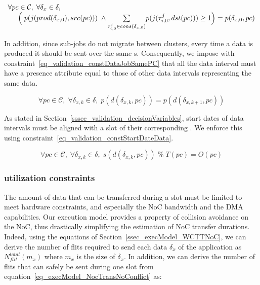\documentclass[main.tex]{subfiles}
\begin{document}
\begin{equation}
    \label{eq_validation_constDataPCmapping}
    \begin{array}{l}
        \forall pc \in \mathcal{C}, \; \forall \delta_{x} \in \delta,  \\
        \hspace{5mm} \Big( \; p(j(prod(\delta_{x,0}), src(pc))) \; \land \underset{\tau_{i,0}^j \in cons(\delta_{x,0})}{\sum} p(j(\tau_{i,0}^j , dst(pc))) \geq 1   \Big)  = p( \delta_{x,0} , pc  ) 
    \end{array}
\end{equation}

In addition, since sub-jobs do not migrate between clusters, every time a data
is produced it should be sent over the same \PC{}s. Consequently, we impose
with constraint~\ref{eq_validation_constDataJobSamePC} that all the data
interval must have a presence attribute equal to those of other data intervals
representing the same data.

\begin{equation}
    \label{eq_validation_constDataJobSamePC}
    \forall pc \in \mathcal{C}, \; \forall \delta_{x,k} \in \delta, \; 
    p( d( \delta_{x,k} , pc ) ) = p( d( \delta_{x,k+1} , pc ) )
\end{equation}

As stated in Section~\ref{sssec_validation_decisionVariables}, start dates of
data intervals must be aligned with a slot of their corresponding \PC{}. We
enforce this using constraint~\ref{eq_validation_constStartDateData}.

\begin{equation}
    \label{eq_validation_constStartDateData}
    \forall pc \in \mathcal{C}, \; \forall \delta_{x,k} \in \delta, \; 
    s( d( \delta_{x,k}, pc ) ) \; \% \; T(pc) = O(pc)
\end{equation}

\subsubsection{\PC{} utilization constraints}
\label{sssec_validation_PCutilConst}
The amount of data that can be transferred during a \PC{} slot must be limited
to meet hardware constraints, and especially the NoC bandwidth and the DMA
capabilities. Our execution model provides a property of collision avoidance on
the NoC, thus drastically simplifying the estimation of NoC transfer durations.
Indeed, using the equations of Section~\ref{ssec_execModel_WCTTNoC}, we can
derive the number of flits required to send each data $\delta_x$ of the
application as $N_{flit}^{total} ( m_x )$ where $m_x$ is the size of
$\delta_x$. In addition, we can derive the number of flits that can safely be
sent during one \PC{} slot from equation~\ref{eq_execModel_NocTransNoConflict}
as:
\end{document}
